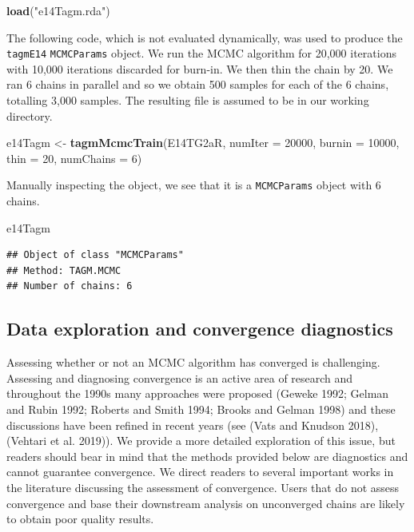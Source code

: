 \documentclass[
]{article}
\newenvironment{Shaded}{\begin{snugshade}}{\end{snugshade}}
\newcommand{\DataTypeTok}[1]{\textcolor[rgb]{0.13,0.29,0.53}{#1}}
\newcommand{\DecValTok}[1]{\textcolor[rgb]{0.00,0.00,0.81}{#1}}
\newcommand{\KeywordTok}[1]{\textcolor[rgb]{0.13,0.29,0.53}{\textbf{#1}}}
\newcommand{\NormalTok}[1]{#1}
\newcommand{\StringTok}[1]{\textcolor[rgb]{0.31,0.60,0.02}{#1}}
\begin{document}
\begin{Shaded}
\begin{Highlighting}[]
\KeywordTok{load}\NormalTok{(}\StringTok{"e14Tagm.rda"}\NormalTok{)}
\end{Highlighting}
\end{Shaded}

The following code, which is not evaluated dynamically, was used to
produce the \texttt{tagmE14} \texttt{MCMCParams} object. We run the MCMC
algorithm for 20,000 iterations with 10,000 iterations discarded for
burn-in. We then thin the chain by 20. We ran 6 chains in parallel and
so we obtain 500 samples for each of the 6 chains, totalling 3,000
samples. The resulting file is assumed to be in our working directory.

\begin{Shaded}
\begin{Highlighting}[]
\NormalTok{e14Tagm <-}\StringTok{ }\KeywordTok{tagmMcmcTrain}\NormalTok{(E14TG2aR,}
                         \DataTypeTok{numIter =} \DecValTok{20000}\NormalTok{,}
                         \DataTypeTok{burnin =} \DecValTok{10000}\NormalTok{,}
                         \DataTypeTok{thin =} \DecValTok{20}\NormalTok{,}
                         \DataTypeTok{numChains =} \DecValTok{6}\NormalTok{)}
\end{Highlighting}
\end{Shaded}

Manually inspecting the object, we see that it is a \texttt{MCMCParams}
object with 6 chains.

\begin{Shaded}
\begin{Highlighting}[]
\NormalTok{e14Tagm}
\end{Highlighting}
\end{Shaded}

\begin{verbatim}
## Object of class "MCMCParams"
## Method: TAGM.MCMC 
## Number of chains: 6
\end{verbatim}

\hypertarget{data-exploration-and-convergence-diagnostics}{%
\subsection{Data exploration and convergence
diagnostics}\label{data-exploration-and-convergence-diagnostics}}

Assessing whether or not an MCMC algorithm has converged is challenging.
Assessing and diagnosing convergence is an active area of research and
throughout the 1990s many approaches were proposed (Geweke 1992; Gelman
and Rubin 1992; Roberts and Smith 1994; Brooks and Gelman 1998) and
these discussions have been refined in recent years (see (Vats and
Knudson 2018), (Vehtari et al. 2019)). We provide a more detailed
exploration of this issue, but readers should bear in mind that the
methods provided below are diagnostics and cannot guarantee convergence.
We direct readers to several important works in the literature
discussing the assessment of convergence. Users that do not assess
convergence and base their downstream analysis on unconverged chains are
likely to obtain poor quality results.
\end{document}
